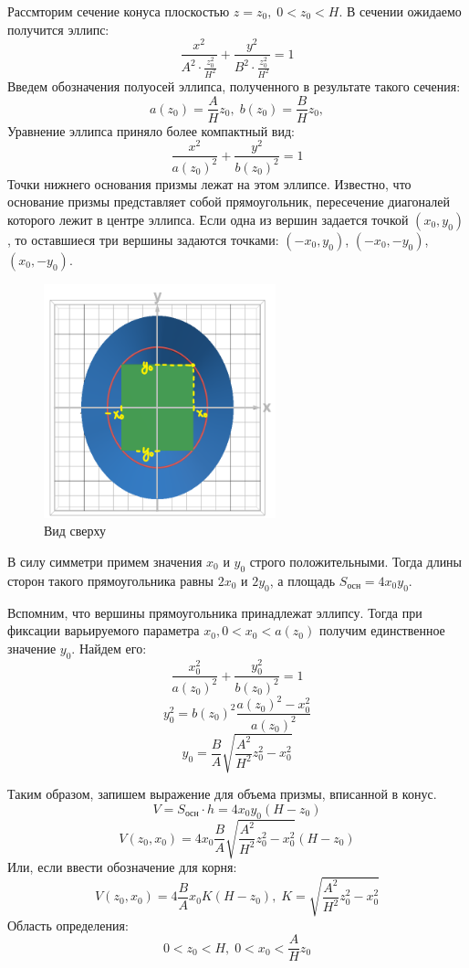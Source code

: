 Рассмторим сечение конуса плоскостью $z = z_0, \; 0 < z_0 < H$. В сечении ожидаемо получится эллипс:
$$
\frac{x^2}{A^2 \cdot \frac{z_0^2}{H^2}} + \frac{y^2}{B^2 \cdot \frac{z_0^2}{H^2}} = 1
$$
Введем обозначения полуосей эллипса, полученного в результате такого сечения:
$$
a(z_0) =  \frac{A}{H} z_0, \; b(z_0) =  \frac{B}{H} z_0,
$$
Уравнение эллипса приняло более компактный вид:
$$
\frac{x^2}{a(z_0)^2} + \frac{y^2}{b(z_0)^2} = 1
$$
Точки нижнего основания призмы лежат на этом эллипсе. Известно, что основание призмы представляет собой прямоугольник, пересечение диагоналей которого лежит в центре эллипса. Если одна из вершин задается точкой $(x_0, y_0)$, то оставшиеся три вершины задаются точками: $(-x_0, y_0)$, $(-x_0, -y_0)$, $(x_0, -y_0)$.
\begin{figure}[H]
\centering
\includegraphics[width=0.6\textwidth]{img/up.png}
\caption{Вид сверху}
\end{figure}
В силу симметри примем значения $x_0$ и $y_0$ строго положительными. Тогда длины сторон такого прямоугольника равны $2x_0$ и $2y_0$, а площадь $S_{\text{осн}} = 4x_0y_0$.

Вспомним, что вершины прямоугольника принадлежат эллипсу. Тогда при фиксации варьируемого параметра $x_0, 0 < x_0 < a(z_0)$ получим единственное значение $y_0$. Найдем его:
$$
\frac{x_0^2}{a(z_0)^2} + \frac{y_0^2}{b(z_0)^2} = 1
$$
$$
y_0^2 = b(z_0)^2 \frac{a(z_0)^2 - x_0^2}{a(z_0)^2}
$$
$$
y_0 = \frac{B}{A} \sqrt{\frac{A^2}{H^2} z_0^2 - x_0^2} 
$$

Таким образом, запишем выражение для объема призмы, вписанной в конус.
$$
V = S_{\text{осн}} \cdot h = 4x_0y_0(H-z_0)
$$
$$
V(z_0, x_0) = 4x_0\frac{B}{A} \sqrt{\frac{A^2}{H^2} z_0^2 - x_0^2} (H - z_0)
$$
Или, если ввести обозначение для корня:
$$
V(z_0, x_0) = 4\frac{B}{A} x_0 K (H - z_0), \; K = \sqrt{\frac{A^2}{H^2} z_0^2 - x_0^2}
$$
Область определения: 
$$
0 < z_0 < H, \; 0 < x_0 < \frac{A}{H}z_0
$$




